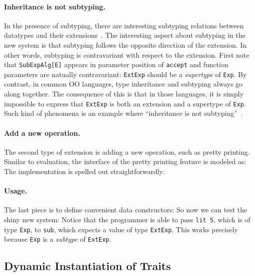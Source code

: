 \paragraph{Inheritance is not subtyping.} In the presence of subtyping, there
are interesting subtyping relations between datatypes and their
extensions~\cite{oliveira09modular}. The interesting aspect about subtyping in
the new system is that subtyping follows the opposite direction of the
extension. In other words, subtyping is contravariant with respect to the
extension. First note that \lstinline{SubExpAlg[E]} appears in parameter
position of \lstinline{accept} and function parameters are natually
contravariant: \lstinline{ExtExp} should be a \textit{supertype} of
\lstinline{Exp}. By contrast, in common OO languages, type inheritance and
subtyping always go along together. The consequence of this is that in those
languages, it is simply impossible to express that \lstinline{ExtExp} is both an
extension and a supertype of \lstinline{Exp}. Such kind of phenomena is an
example where ``inheritance is not subtyping''~\cite{cook1989inheritance}.

\paragraph{Add a new operation.} The second type of extension is adding a new
operation, such as pretty printing. Similar to evaluation, the interface of the
pretty printing feature is modeled as:
The implementation is spelled out straightforwardly:


\paragraph{Usage.} The last piece is to define convenient data constructors:
So now we can test the shiny new system:
Notice that the programmer is able to pass \lstinline{lit 5}, which is of type
\lstinline{Exp}, to \lstinline{sub}, which expects a value of type
\lstinline{ExtExp}. This works precisely because \lstinline{Exp} is a
\textit{subtype} of \lstinline{ExtExp}.



\subsection{Dynamic Instantiation of Traits}


